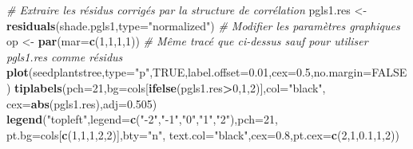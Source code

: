 \documentclass[
]{book}
\newenvironment{Shaded}{\begin{snugshade}}{\end{snugshade}}
\newcommand{\AttributeTok}[1]{\textcolor[rgb]{0.13,0.29,0.53}{#1}}
\newcommand{\CommentTok}[1]{\textcolor[rgb]{0.56,0.35,0.01}{\textit{#1}}}
\newcommand{\ConstantTok}[1]{\textcolor[rgb]{0.56,0.35,0.01}{#1}}
\newcommand{\DecValTok}[1]{\textcolor[rgb]{0.00,0.00,0.81}{#1}}
\newcommand{\FloatTok}[1]{\textcolor[rgb]{0.00,0.00,0.81}{#1}}
\newcommand{\FunctionTok}[1]{\textcolor[rgb]{0.13,0.29,0.53}{\textbf{#1}}}
\newcommand{\NormalTok}[1]{#1}
\newcommand{\OtherTok}[1]{\textcolor[rgb]{0.56,0.35,0.01}{#1}}
\newcommand{\SpecialCharTok}[1]{\textcolor[rgb]{0.81,0.36,0.00}{\textbf{#1}}}
\newcommand{\StringTok}[1]{\textcolor[rgb]{0.31,0.60,0.02}{#1}}
\begin{document}
\begin{Shaded}
\begin{Highlighting}[]
\CommentTok{\# Extraire les résidus corrigés par la structure de corrélation}
\NormalTok{pgls1.res }\OtherTok{\textless{}{-}} \FunctionTok{residuals}\NormalTok{(shade.pgls1,}\AttributeTok{type=}\StringTok{"normalized"}\NormalTok{)}
\CommentTok{\# Modifier les paramètres graphiques}
\NormalTok{op }\OtherTok{\textless{}{-}} \FunctionTok{par}\NormalTok{(}\AttributeTok{mar=}\FunctionTok{c}\NormalTok{(}\DecValTok{1}\NormalTok{,}\DecValTok{1}\NormalTok{,}\DecValTok{1}\NormalTok{,}\DecValTok{1}\NormalTok{))}
\CommentTok{\# Même tracé que ci{-}dessus sauf pour utiliser pgls1.res comme résidus}
\FunctionTok{plot}\NormalTok{(seedplantstree,}\AttributeTok{type=}\StringTok{"p"}\NormalTok{,}\ConstantTok{TRUE}\NormalTok{,}\AttributeTok{label.offset=}\FloatTok{0.01}\NormalTok{,}\AttributeTok{cex=}\FloatTok{0.5}\NormalTok{,}\AttributeTok{no.margin=}\ConstantTok{FALSE}\NormalTok{)}
\FunctionTok{tiplabels}\NormalTok{(}\AttributeTok{pch=}\DecValTok{21}\NormalTok{,}\AttributeTok{bg=}\NormalTok{cols[}\FunctionTok{ifelse}\NormalTok{(pgls1.res}\SpecialCharTok{\textgreater{}}\DecValTok{0}\NormalTok{,}\DecValTok{1}\NormalTok{,}\DecValTok{2}\NormalTok{)],}\AttributeTok{col=}\StringTok{"black"}\NormalTok{,}
          \AttributeTok{cex=}\FunctionTok{abs}\NormalTok{(pgls1.res),}\AttributeTok{adj=}\FloatTok{0.505}\NormalTok{)}
\FunctionTok{legend}\NormalTok{(}\StringTok{"topleft"}\NormalTok{,}\AttributeTok{legend=}\FunctionTok{c}\NormalTok{(}\StringTok{"{-}2"}\NormalTok{,}\StringTok{"{-}1"}\NormalTok{,}\StringTok{"0"}\NormalTok{,}\StringTok{"1"}\NormalTok{,}\StringTok{"2"}\NormalTok{),}\AttributeTok{pch=}\DecValTok{21}\NormalTok{,}
       \AttributeTok{pt.bg=}\NormalTok{cols[}\FunctionTok{c}\NormalTok{(}\DecValTok{1}\NormalTok{,}\DecValTok{1}\NormalTok{,}\DecValTok{1}\NormalTok{,}\DecValTok{2}\NormalTok{,}\DecValTok{2}\NormalTok{)],}\AttributeTok{bty=}\StringTok{"n"}\NormalTok{,}
       \AttributeTok{text.col=}\StringTok{"black"}\NormalTok{,}\AttributeTok{cex=}\FloatTok{0.8}\NormalTok{,}\AttributeTok{pt.cex=}\FunctionTok{c}\NormalTok{(}\DecValTok{2}\NormalTok{,}\DecValTok{1}\NormalTok{,}\FloatTok{0.1}\NormalTok{,}\DecValTok{1}\NormalTok{,}\DecValTok{2}\NormalTok{))}
\end{Highlighting}
\end{Shaded}
\end{document}
